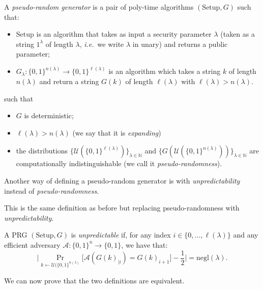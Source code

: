 \documentclass[./main]{subfiles}
\begin{document}
  \begin{defn}
    A \textit{pseudo-random generator} is a pair of poly-time algorithms $(\mathrm{Setup}, G)$ such that:
    \begin{itemize}
      \item $\mathrm{Setup}$ is an algorithm that takes as input a security parameter $\lambda$ (taken as a string $1^\lambda$ of length $\lambda$, \textit{i.e.}\ we write $\lambda$ in unary) and returns a public parameter;
      \item $G_\lambda : \{0,1\}^{n(\lambda)} \to \{0,1\}^{\ell(\lambda)}$ is an algorithm which takes a string $k$ of length $n(\lambda)$ and return a string $G(k)$ of length $\ell(\lambda)$ with $\ell(\lambda) > n(\lambda)$.
    \end{itemize}
    such that
    \begin{itemize}
      \item $G$ is deterministic;
      \item $\ell(\lambda) > n(\lambda)$ (we say that it is \textit{expanding})
      \item the distributions $\{\mathcal{U}(\{0,1\}^{\ell(\lambda)})\}_{\lambda \in \mathds{N}}$ and $\{G(\mathcal{U}(\{0,1\} ^{n(\lambda)}))\}_{\lambda \in \mathds{N}}$ are computationally indistinguishable (we call it \textit{pseudo-randomness}).
    \end{itemize}
  \end{defn}
  
  Another way of defining a pseudo-random generator is with \textit{unpredictability} instead of \textit{pseudo-randomness}.
  \begin{defn}
    This is the same definition as before but replacing pseudo-randomness with \textit{unpredictability}.

    A PRG $(\mathrm{Setup}, G)$ is \textit{unpredictable} if, for any index $i \in \{0, \ldots, \ell(\lambda)\}$ and any efficient adversary $\mathcal{A} : \{0,1\}^{n} \to \{0,1\}$, we have that:
    \[
    \Big|
    \Pr_{k \gets \mathcal{U}(\{0, 1\}^{n(\lambda)} } \big[\mathcal{A}(G(k)_{|i}) = G(k)_{i+1}\big] - \frac{1}{2}
    \Big| = \mathrm{negl}(\lambda)
    .\]
  \end{defn}

  We can now prove that the two definitions are equivalent.
\end{document}
